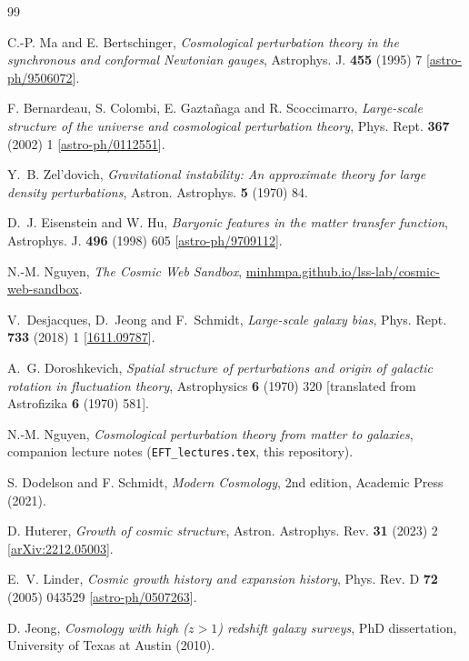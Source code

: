 \documentclass[a4paper,11pt]{article}
\numberwithin{equation}{section}
\begin{document}
\begin{thebibliography}{99}

C.-P. Ma and E. Bertschinger,
\emph{Cosmological perturbation theory in the synchronous and conformal Newtonian gauges},
Astrophys. J. \textbf{455} (1995) 7
[\href{https://arxiv.org/abs/astro-ph/9506072}{astro-ph/9506072}].

F. Bernardeau, S. Colombi, E. Gazta\~naga and R. Scoccimarro,
\emph{Large-scale structure of the universe and cosmological perturbation theory},
Phys. Rept. \textbf{367} (2002) 1
[\href{https://arxiv.org/abs/astro-ph/0112551}{astro-ph/0112551}].

Y.~B. Zel'dovich,
\emph{Gravitational instability: An approximate theory for large density perturbations},
Astron. Astrophys. \textbf{5} (1970) 84.

D.~J. Eisenstein and W. Hu,
\emph{Baryonic features in the matter transfer function},
Astrophys. J. \textbf{496} (1998) 605
[\href{https://arxiv.org/abs/astro-ph/9709112}{astro-ph/9709112}].

N.-M. Nguyen,
\emph{The Cosmic Web Sandbox},
\href{https://minhmpa.github.io/lss-lab/cosmic-web-sandbox/}{minhmpa.github.io/lss-lab/cosmic-web-sandbox}.

V.~Desjacques, D.~Jeong and F.~Schmidt,
\emph{Large-scale galaxy bias},
Phys. Rept. \textbf{733} (2018) 1
[\href{https://arxiv.org/abs/1611.09787}{1611.09787}].

A.~G. Doroshkevich,
\emph{Spatial structure of perturbations and origin of galactic rotation in fluctuation theory},
Astrophysics \textbf{6} (1970) 320
[translated from Astrofizika \textbf{6} (1970) 581].

N.-M. Nguyen,
\emph{Cosmological perturbation theory from matter to galaxies},
companion lecture notes (\texttt{EFT\_lectures.tex}, this repository).

S. Dodelson and F. Schmidt,
\emph{Modern Cosmology}, 2nd edition,
Academic Press (2021).

D. Huterer,
\emph{Growth of cosmic structure},
Astron. Astrophys. Rev. \textbf{31} (2023) 2
[\href{https://arxiv.org/abs/2212.05003}{arXiv:2212.05003}].

E.~V. Linder,
\emph{Cosmic growth history and expansion history},
Phys. Rev. D \textbf{72} (2005) 043529
[\href{https://arxiv.org/abs/astro-ph/0507263}{astro-ph/0507263}].

D. Jeong,
\emph{Cosmology with high ($z>1$) redshift galaxy surveys},
PhD dissertation, University of Texas at Austin (2010).

\end{thebibliography}
\end{document}
